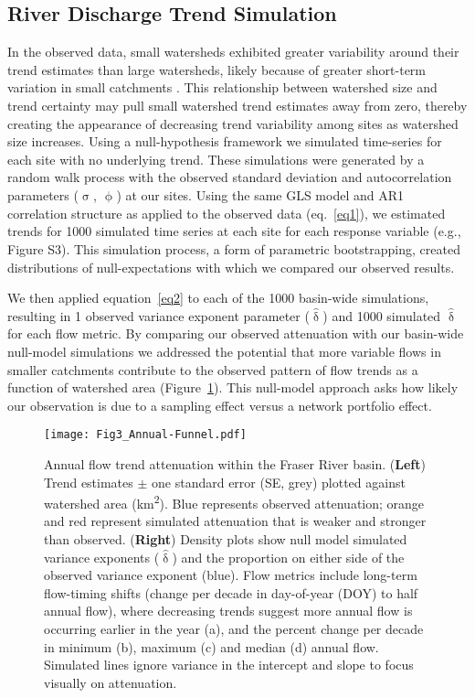 \documentclass[linenumbers,draft]{AGUJournal}
\begin{document}
\subsection{River Discharge Trend Simulation}
In the observed data, small watersheds exhibited greater variability around their trend estimates than large watersheds, likely because of greater short-term variation in small catchments \citep{Moore:2015}. This relationship between watershed size and trend certainty may pull small watershed trend estimates away from zero, thereby creating the appearance of decreasing trend variability among sites as watershed size increases. Using a null-hypothesis framework we simulated time-series for each site with no underlying trend. These simulations were generated by a random walk process with the observed standard deviation and autocorrelation parameters ($\hat{\upsigma}$, $\hat{\upphi}$) at our sites. Using the same GLS model and AR1 correlation structure as applied to the observed data (eq.~\ref{eq1}), we estimated trends for 1000 simulated time series at each site for each response variable (e.g., Figure S3). This simulation process, a form of parametric bootstrapping, created distributions of null-expectations with which we compared our observed results.

We then applied equation~\ref{eq2} to each of the 1000 basin-wide simulations, resulting in 1 observed variance exponent parameter ($\hat{\updelta}$) and 1000 simulated $\hat{\updelta}$ for each flow metric. By comparing our observed attenuation with our basin-wide null-model simulations we addressed the potential that more variable flows in smaller catchments contribute to the observed pattern of flow trends as a function of watershed area (Figure~\ref{figthree}). This null-model approach asks how likely our observation is due to a sampling effect versus a network portfolio effect.

\begin{figure}[h]
	\centerline{\texttt{[image: Fig3\_Annual-Funnel.pdf]}}
	\caption{Annual flow trend attenuation within the Fraser River basin. (\textbf{Left}) Trend estimates $\pm$ one standard error (SE, grey) plotted against watershed area (km\textsuperscript{2}). Blue represents observed attenuation; orange and red represent simulated attenuation that is weaker and stronger than observed. (\textbf{Right}) Density plots show null model simulated variance exponents ($\hat{\updelta}$) and the proportion on either side of the observed variance exponent (blue). Flow metrics include long-term flow-timing shifts (change per decade in day-of-year (DOY) to half annual flow), where decreasing trends suggest more annual flow is occurring earlier in the year (a), and the percent change per decade in minimum (b), maximum (c) and median (d) annual flow. Simulated lines ignore variance in the intercept and slope to focus visually on attenuation.}
	\label{figthree}
\end{figure}
\end{document}
